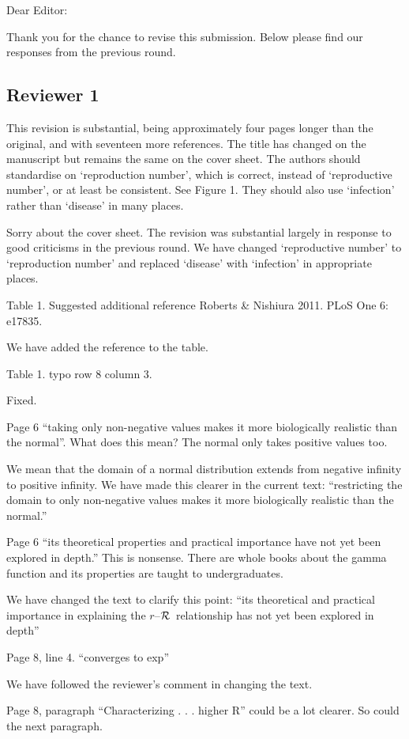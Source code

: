 \documentclass[12pt]{article}
\newcommand{\rR}{\mbox{$r$--$\cal R$}}
\newcommand{\rev}{\subsection*}
\newcommand{\revtext}{\textsf}
\begin{document}
\noindent Dear Editor:

Thank you for the chance to revise this submission. Below please find our responses from the previous round.

\rev{Reviewer 1}

\revtext{This revision is substantial, being approximately four pages longer than the
original, and with seventeen more references. The title has changed on the
manuscript but remains the same on the cover sheet. The authors should
standardise on ‘reproduction number’, which is correct, instead of ‘reproductive
number’, or at least be consistent. See Figure 1. They should also use ‘infection’
rather than ‘disease’ in many places.}

Sorry about the cover sheet. The revision was substantial largely in response to good criticisms in the previous round.
We have changed `reproductive number' to `reproduction number' and replaced `disease' with `infection' in appropriate places.

\revtext{Table 1. Suggested additional reference Roberts \& Nishiura 2011. PLoS One 6: e17835.}

We have added the reference to the table.

\revtext{Table 1. typo row 8 column 3.}

Fixed.

\revtext{Page 6 “taking only non-negative values makes it more biologically realistic than the normal”. What does this mean? The normal only takes positive values too.}

We mean that the domain of a normal distribution extends from negative infinity to positive infinity.
We have made this clearer in the current text: ``restricting the domain to only non-negative values makes it more biologically realistic than the normal.''

\revtext{Page 6 “its theoretical properties and practical importance have not yet been explored in depth.” This is nonsense. There are whole books about the gamma function and its properties are taught to undergraduates.}

We have changed the text to clarify this point: ``its theoretical and practical importance in explaining the \rR\ relationship has not yet been explored in depth''

\revtext{Page 8, line 4. “converges to exp”}

We have followed the reviewer's comment in changing the text.

\revtext{Page 8, paragraph “Characterizing . . . higher R” could be a lot clearer. So could the next paragraph.}
\end{document}
